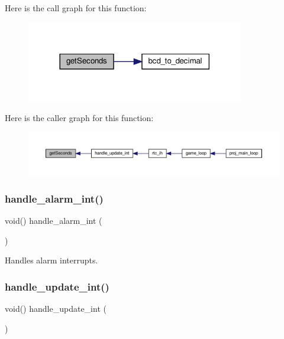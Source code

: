 Here is the call graph for this function\+:
\nopagebreak
\begin{figure}[H]
\begin{center}
\leavevmode
\includegraphics[width=269pt]{group__rtc_ga03144495c6cd7841203162b527998b53_cgraph}
\end{center}
\end{figure}
Here is the caller graph for this function\+:
\nopagebreak
\begin{figure}[H]
\begin{center}
\leavevmode
\includegraphics[width=350pt]{group__rtc_ga03144495c6cd7841203162b527998b53_icgraph}
\end{center}
\end{figure}
\mbox{\label{group__rtc_ga3cda919fc58bfbb8b4d08c54954d8fec}} 
\subsubsection{\texorpdfstring{handle\+\_\+alarm\+\_\+int()}{handle\_alarm\_int()}}
{\footnotesize\ttfamily void() handle\+\_\+alarm\+\_\+int (\begin{DoxyParamCaption}{ }\end{DoxyParamCaption})}



Handles alarm interrupts. 

\mbox{\label{group__rtc_ga9f92f313c3714cb364715862d8737cd4}} 
\subsubsection{\texorpdfstring{handle\+\_\+update\+\_\+int()}{handle\_update\_int()}}
{\footnotesize\ttfamily void() handle\+\_\+update\+\_\+int (\begin{DoxyParamCaption}{ }\end{DoxyParamCaption})}



